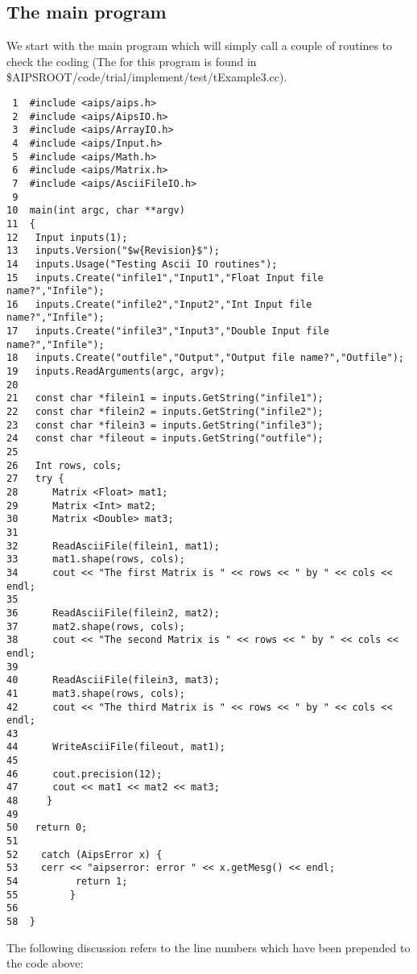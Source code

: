 \subsection{The main program}

We start with the main program which will simply call a couple of routines to
check the coding 
(The 
for this program is found in 
\$AIPSROOT/code/trial/implement/test/tExample3.cc). 

\begin{verbatim}
 1  #include <aips/aips.h>
 2  #include <aips/AipsIO.h>
 3  #include <aips/ArrayIO.h>
 4  #include <aips/Input.h>
 5  #include <aips/Math.h>
 6  #include <aips/Matrix.h>
 7  #include <aips/AsciiFileIO.h>
 9  
10  main(int argc, char **argv)
11  {
12   Input inputs(1);
13   inputs.Version("$w{Revision}$");
14   inputs.Usage("Testing Ascii IO routines");
15   inputs.Create("infile1","Input1","Float Input file name?","Infile");
16   inputs.Create("infile2","Input2","Int Input file name?","Infile");
17   inputs.Create("infile3","Input3","Double Input file name?","Infile");
18   inputs.Create("outfile","Output","Output file name?","Outfile");
19   inputs.ReadArguments(argc, argv);
20  
21   const char *filein1 = inputs.GetString("infile1");
22   const char *filein2 = inputs.GetString("infile2");
23   const char *filein3 = inputs.GetString("infile3");
24   const char *fileout = inputs.GetString("outfile");
25  
26   Int rows, cols;
27   try {
28      Matrix <Float> mat1;
29      Matrix <Int> mat2;
30      Matrix <Double> mat3;
31  
32      ReadAsciiFile(filein1, mat1);
33      mat1.shape(rows, cols);
34      cout << "The first Matrix is " << rows << " by " << cols << endl;
35  
36      ReadAsciiFile(filein2, mat2);
37      mat2.shape(rows, cols);
38      cout << "The second Matrix is " << rows << " by " << cols << endl;
39  
40      ReadAsciiFile(filein3, mat3);
41      mat3.shape(rows, cols);
42      cout << "The third Matrix is " << rows << " by " << cols << endl;
43  
44      WriteAsciiFile(fileout, mat1);
45  
46      cout.precision(12);
47      cout << mat1 << mat2 << mat3;
48     }
49  
50   return 0;
51
52    catch (AipsError x) {
53    cerr << "aipserror: error " << x.getMesg() << endl;
54          return 1;
55         }
56
58  }
\end{verbatim}


The following discussion refers to the line numbers which have been prepended 
to the code above:

